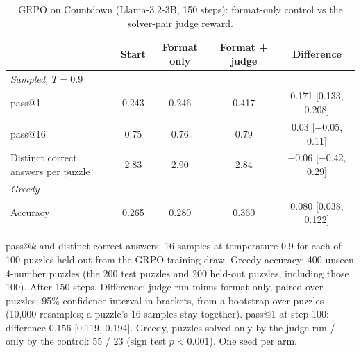 \begin{table}[H]
\centering
\caption{GRPO on Countdown (Llama-3.2-3B, 150 steps): format-only control vs the solver-pair judge reward.}
\label{tab:format-vs-solver}
\begin{threeparttable}
\begin{tabular}{lcccc}
\toprule
 & Start & Format only & Format + judge & Difference \\
\midrule
\multicolumn{5}{l}{\emph{Sampled, $T=0.9$}} \\
pass@1 & 0.243 & 0.246 & 0.417 & 0.171 {\footnotesize [0.133, 0.208]} \\
pass@16 & 0.75 & 0.76 & 0.79 & 0.03 {\footnotesize [$-$0.05, 0.11]} \\
Distinct correct answers per puzzle & 2.83 & 2.90 & 2.84 & $-$0.06 {\footnotesize [$-$0.42, 0.29]} \\
\midrule
\multicolumn{5}{l}{\emph{Greedy}} \\
Accuracy & 0.265 & 0.280 & 0.360 & 0.080 {\footnotesize [0.038, 0.122]} \\
\bottomrule
\end{tabular}
\begin{tablenotes}\footnotesize
\item pass@$k$ and distinct correct answers: 16 samples at temperature 0.9 for each of 100 puzzles held out from the GRPO training draw. Greedy accuracy: 400 unseen 4-number puzzles (the 200 test puzzles and 200 held-out puzzles, including those 100). After 150 steps. Difference: judge run minus format only, paired over puzzles; 95\% confidence interval in brackets, from a bootstrap over puzzles (10,000 resamples; a puzzle's 16 samples stay together). pass@1 at step 100: difference 0.156 [0.119, 0.194]. Greedy, puzzles solved only by the judge run / only by the control: 55 / 23 (sign test $p < 0.001$). One seed per arm.
\end{tablenotes}
\end{threeparttable}
\end{table}
